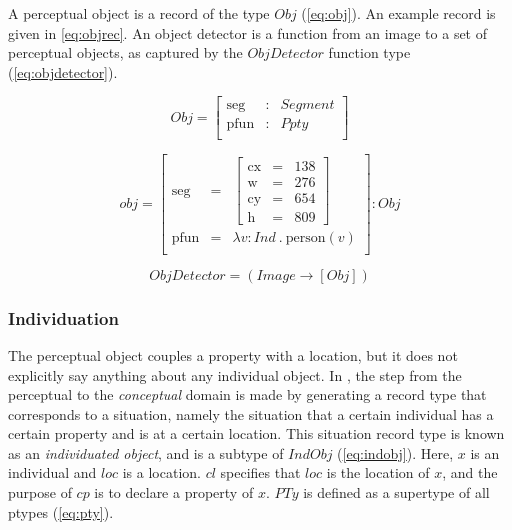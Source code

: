 A perceptual object is a record of the type $Obj$ (\autoref{eq:obj}).
An example record is given in \autoref{eq:objrec}.
An object detector is a function from an image to a set of perceptual objects, as captured by the $ObjDetector$ function type (\autoref{eq:objdetector}).


\begin{equation}\label{eq:obj}
Obj = \left[\begin{array}{rcl}
\text{seg} &:& Segment\\
\text{pfun} &:& Ppty \\
\end{array}\right]\end{equation}

\begin{equation}\label{eq:objrec}
obj =
\left[\begin{array}{rcl}
\text{seg} &=& \left[\begin{array}{rcl}
\text{cx} &=& 138\\
\text{w} &=& 276\\
\text{cy} &=& 654\\
\text{h} &=& 809
\end{array}\right]\\
\text{pfun} &=& \lambda v:Ind\ .\ \text{person}(v)\\
\end{array}\right] : Obj\end{equation}

\begin{equation}\label{eq:objdetector}
ObjDetector = ( Image \rightarrow [Obj] )
\end{equation}



\subsubsection{Individuation}

The perceptual object couples a property with a location, but it does not explicitly say anything about any individual object.
In \cite{lspc}, the step from the perceptual to the \textit{conceptual} domain is made by generating a record type that corresponds to a situation, namely the situation that a certain individual has a certain property and is at a certain location.
This situation record type is known as an \textit{individuated object}, and is a subtype of $IndObj$ (\autoref{eq:indobj}).
Here, $x$ is an individual and $loc$ is a location.
$cl$ specifies that $loc$ is the location of $x$, and the purpose of $cp$ is to declare a property of $x$.
$PTy$ is defined as a supertype of all ptypes (\autoref{eq:pty}).

